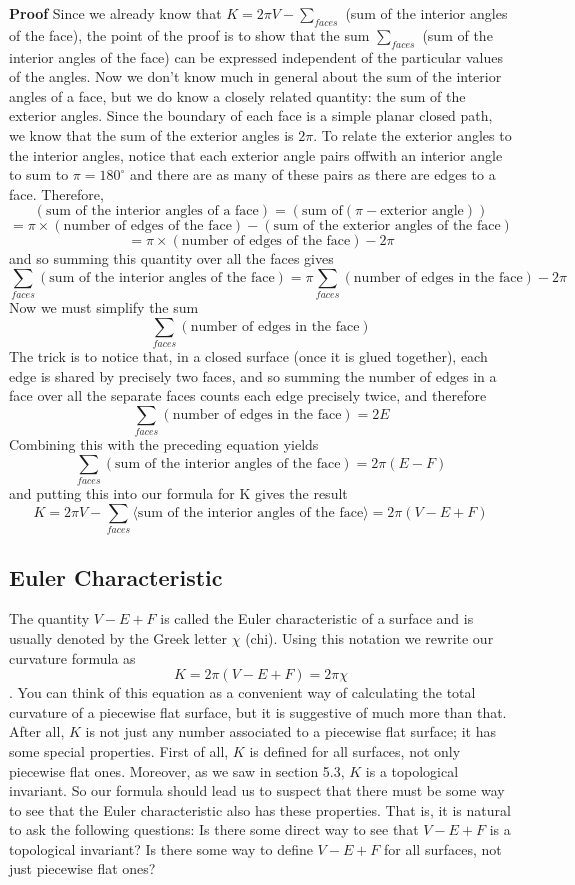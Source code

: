 \documentclass{book}
\begin{document}
\noindent \textbf{Proof} Since we already know that $K = 2 \pi V - \sum_{faces}$ (sum of the interior angles of the face), the point of the proof is to show that the sum $ \sum_{faces}$ (sum of the interior angles of the face) can be expressed independent of the particular values of the angles. Now
we don't know much in general about the sum of the interior angles of a
face, but we do know a closely related quantity: the sum of the exterior
angles. Since the boundary of each face is a simple planar closed path,
we know that the sum of the exterior angles is $2 \pi$. To relate the exterior
angles to the interior angles, notice that each exterior angle pairs offwith
an interior angle to sum to $\pi = 180^{\circ}$ and there are as many of these
pairs as there are edges to a face. Therefore,
$$(\text{sum of the interior angles of a face}) = (\text{sum of} (\pi - \text{exterior angle}))$$
$$ = \pi \times  (\text{number of edges of the face}) - (\text{sum of the exterior angles of the face})$$
$$ =\pi \times (\text{number of edges of the face}) - 2 \pi$$
 and so summing this quantity over all the faces gives
$$\sum_{faces} (\text{sum of the interior angles of the face}) = \pi \sum_{faces}  (\text{number of edges in the face}) - 2 \pi $$
 Now we must simplify the sum
$$ \sum_{faces} (\text{number of edges in the face})$$
 The trick is to notice that, in a closed surface (once it is glued together),
each edge is shared by precisely two faces, and so summing the number of
edges in a face over all the separate faces counts each edge precisely
twice, and therefore
$$\sum_{faces} (\text{number of edges in the face}) = 2E$$
 Combining this with the preceding equation yields
$$\sum_{faces} (\text{sum of the interior angles of the face}) = 2 \pi (E - F)$$
 and putting this into our formula for K gives the result
$$K = 2 \pi V - \sum_{faces} \langle \text{sum of the interior angles of the face} \rangle = 2 \pi (V -E + F)$$

\subsection{Euler Characteristic}

The quantity $V - E + F$ is called the Euler characteristic of a surface
and is usually denoted by the Greek letter $\chi$ (chi). Using this notation
we rewrite our curvature formula as
$$K = 2 \pi (V - E + F) = 2 \pi \chi $$.
 You can think of this equation as a convenient way of calculating the
total curvature of a piecewise flat surface, but it is suggestive of much
more than that. After all, $K$ is not just any number associated to a
piecewise flat surface; it has some special properties. First of all, $K$ is
defined for all surfaces, not only piecewise flat ones. Moreover, as we
saw in section 5.3, $K$ is a topological invariant. So our formula should
lead us to suspect that there must be some way to see that the Euler
characteristic also has these properties. That is, it is natural to ask the
following questions: Is there some direct way to see that $V - E + F$ is
a topological invariant? Is there some way to define $V - E + F$ for all
surfaces, not just piecewise flat ones?
\end{document}

